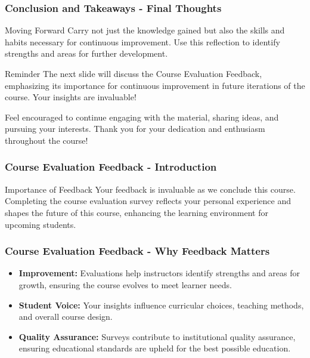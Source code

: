 \documentclass[aspectratio=169]{beamer}
\begin{document}
\begin{frame}[fragile]
    \frametitle{Conclusion and Takeaways - Final Thoughts}
    \begin{block}{Moving Forward}
        Carry not just the knowledge gained but also the skills and habits necessary for continuous 
        improvement. Use this reflection to identify strengths and areas for further development.
    \end{block}

    \begin{block}{Reminder}
        The next slide will discuss the Course Evaluation Feedback, emphasizing its importance for 
        continuous improvement in future iterations of the course. Your insights are invaluable!
    \end{block}
    
    Feel encouraged to continue engaging with the material, sharing ideas, and pursuing your interests. 
    Thank you for your dedication and enthusiasm throughout the course!
\end{frame}

\begin{frame}[fragile]
  \frametitle{Course Evaluation Feedback - Introduction}
  
  \begin{block}{Importance of Feedback}
    Your feedback is invaluable as we conclude this course. 
    Completing the course evaluation survey reflects your personal experience and shapes the future of this course, enhancing the learning environment for upcoming students.
  \end{block}
  
\end{frame}

\begin{frame}[fragile]
  \frametitle{Course Evaluation Feedback - Why Feedback Matters}
  
  \begin{itemize}
    \item \textbf{Improvement:} Evaluations help instructors identify strengths and areas for growth, ensuring the course evolves to meet learner needs.
    
    \item \textbf{Student Voice:} Your insights influence curricular choices, teaching methods, and overall course design.
    
    \item \textbf{Quality Assurance:} Surveys contribute to institutional quality assurance, ensuring educational standards are upheld for the best possible education.
  \end{itemize}

\end{frame}
\end{document}
